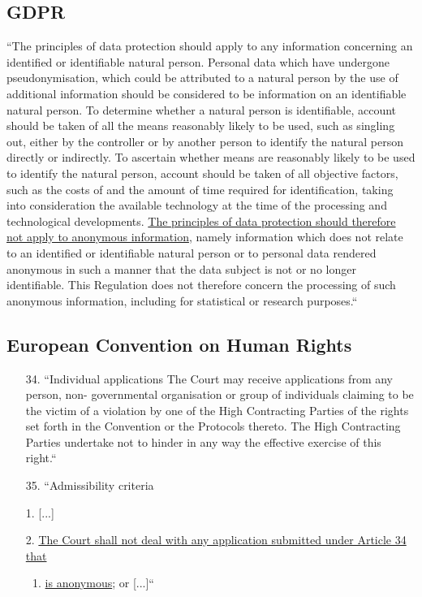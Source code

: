 \documentclass{article}
\begin{document}
  \subsection{\label{subsec:GDPR}GDPR}
  ``The principles of data protection should apply to any information concerning an
  identified or identifiable natural person. 
  Personal data which have undergone pseudonymisation, which could be attributed to a natural person by
  the use of additional information should be considered to be information on an identifiable natural person. To
  determine whether a natural person is identifiable, account should be taken of all the means reasonably likely to
  be used, such as singling out, either by the controller or by another person to identify the natural person directly
  or indirectly. To ascertain whether means are reasonably likely to be used to identify the natural person, account
  should be taken of all objective factors, such as the costs of and the amount of time required for identification,
  taking into consideration the available technology at the time of the processing and technological developments.
  \ul{The principles of data protection should therefore not apply to anonymous information}, namely information
  which does not relate to an identified or identifiable natural person or to personal data rendered anonymous in
  such a manner that the data subject is not or no longer identifiable. This Regulation does not therefore concern
  the processing of such anonymous information, including for statistical or research purposes.`` \cite{GDPR2016}

  \subsection{\label{subsec:ECHR}European Convention on Human Rights}
  \begin{enumerate}
    \item[34.] ``Individual applications
  The Court may receive applications from any person, non-
  governmental organisation or group of individuals claiming to be
  the victim of a violation by one of the High Contracting Parties of
  the rights set forth in the Convention or the Protocols thereto. The
  High Contracting Parties undertake not to hinder in any way the
  effective exercise of this right.``

\item[35.] ``Admissibility criteria
\end{enumerate}
  \begin{enumerate}
    \item[1.] [...]
    \item[2.] \ul{The Court shall not deal with any application submitted under Article 34 that}
    \begin{enumerate}
      \item \ul{is anonymous}; or [...]`` \cite{ECHR1950}
    \end{enumerate}
  \end{enumerate}
\end{document}

